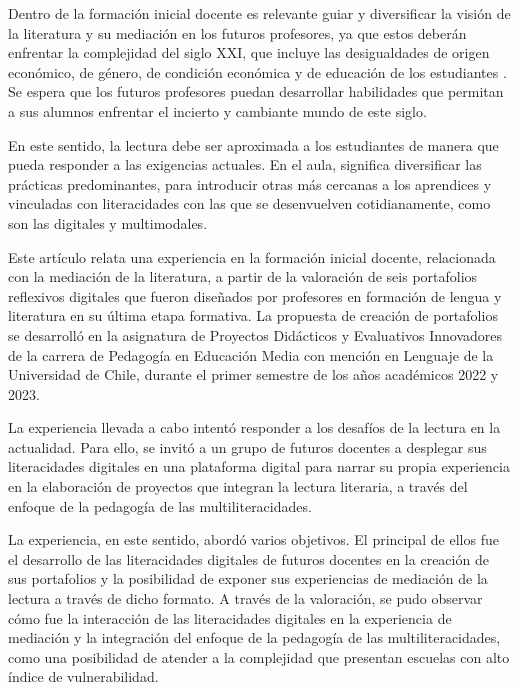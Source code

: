 Dentro de la formación inicial docente es relevante guiar y diversificar
la visión de la literatura y su mediación en los futuros profesores, ya
que estos deberán enfrentar la complejidad del siglo XXI, que incluye
las desigualdades de origen económico, de género, de condición económica
y de educación de los estudiantes \cite{oecd_2019}. Se espera que los
futuros profesores puedan desarrollar habilidades que permitan a sus
alumnos enfrentar el incierto y cambiante mundo de este siglo.

En este sentido, la lectura debe ser aproximada a los estudiantes de
manera que pueda responder a las exigencias actuales. En el aula,
significa diversificar las prácticas predominantes, para introducir
otras más cercanas a los aprendices y vinculadas con literacidades con
las que se desenvuelven cotidianamente, como son las digitales y
multimodales.

Este artículo relata una experiencia en la formación inicial docente,
relacionada con la mediación de la literatura, a partir de la valoración
de seis portafolios reflexivos digitales que fueron diseñados por
profesores en formación de lengua y literatura en su última etapa
formativa. La propuesta de creación de portafolios se desarrolló en la
asignatura de Proyectos Didácticos y Evaluativos Innovadores de la
carrera de Pedagogía en Educación Media con mención en Lenguaje de la
Universidad de Chile, durante el primer semestre de los años académicos
2022 y 2023.

La experiencia llevada a cabo intentó responder a los desafíos de la
lectura en la actualidad. Para ello, se invitó a un grupo de futuros
docentes a desplegar sus literacidades digitales en una plataforma
digital para narrar su propia experiencia en la elaboración de proyectos
que integran la lectura literaria, a través del enfoque de la pedagogía
de las multiliteracidades.

La experiencia, en este sentido, abordó varios objetivos. El principal
de ellos fue el desarrollo de las literacidades digitales de futuros
docentes en la creación de sus portafolios y la posibilidad de exponer
sus experiencias de mediación de la lectura a través de dicho formato. A
través de la valoración, se pudo observar cómo fue la interacción de las
literacidades digitales en la experiencia de mediación y la integración
del enfoque de la pedagogía de las multiliteracidades, como una
posibilidad de atender a la complejidad que presentan escuelas con alto
índice de vulnerabilidad.